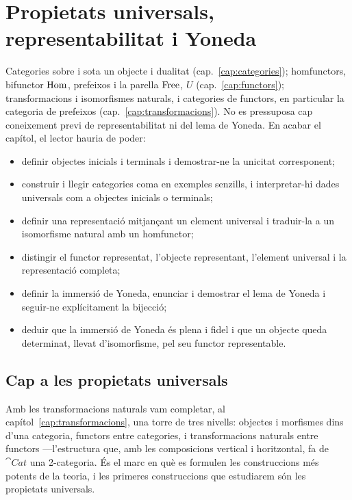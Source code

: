 \chapter[Representabilitat i Yoneda]{\texorpdfstring{Propietats universals,\\ representabilitat i Yoneda}{Propietats universals, representabilitat i Yoneda}}
\label{cap:yoneda}

\begin{objectius}
 Categories sobre i sota un objecte i dualitat (cap.~\ref{cap:categories}); homfunctors, bifunctor $\operatorname{Hom}$, prefeixos i la parella $\operatorname{Free}$, $U$ (cap.~\ref{cap:functors}); transformacions i isomorfismes naturals, i categories de functors, en particular la categoria de prefeixos (cap.~\ref{cap:transformacions}). No es pressuposa cap coneixement previ de representabilitat ni del lema de Yoneda.
 En acabar el capítol, el lector hauria de poder:
\begin{itemize}
  \item definir objectes inicials i terminals i demostrar-ne la unicitat corresponent;
  \item construir i llegir categories coma en exemples senzills, i interpretar-hi dades universals com a objectes inicials o terminals;
  \item definir una representació mitjançant un element universal i traduir-la a un isomorfisme natural amb un homfunctor;
  \item distingir el functor representat, l'objecte representant, l'element universal i la representació completa;
  \item definir la immersió de Yoneda, enunciar i demostrar el lema de Yoneda i seguir-ne explícitament la bijecció;
  \item deduir que la immersió de Yoneda és plena i fidel i que un objecte queda determinat, llevat d'isomorfisme, pel seu functor representable.
\end{itemize}
\end{objectius}

\section{Cap a les propietats universals}

Amb les transformacions naturals vam completar, al capítol~\ref{cap:transformacions}, una torre de tres nivells: objectes i morfismes dins d'una categoria, functors entre categories, i transformacions naturals entre functors ---l'estructura que, amb les composicions vertical i horitzontal, fa de $\cat{Cat}$ una 2-categoria. És el marc en què es formulen les construccions més potents de la teoria, i les primeres construccions que estudiarem són les propietats universals.

